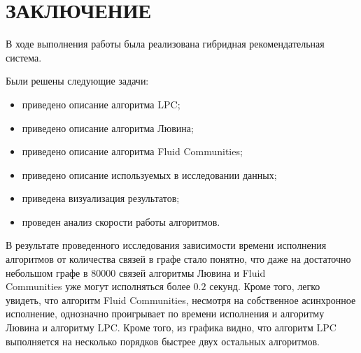 \section*{ЗАКЛЮЧЕНИЕ}
В ходе выполнения работы была реализована гибридная рекомендательная система.

Были решены следующие задачи:
\begin{itemize}
	\item приведено описание алгоритма LPC;
	\item приведено описание алгоритма Лювина;
	\item приведено описание алгоритма Fluid Communities;
	\item приведено описание используемых в исследовании данных;
	\item приведена визуализация результатов;
	\item проведен анализ скорости работы алгоритмов.
\end{itemize}

В результате проведенного исследования зависимости времени исполнения алгоритмов от количества связей в графе стало понятно, что даже на достаточно небольшом графе в 80000 связей алгоритмы Лювина и Fluid\\
Communities уже могут исполняться более $0.2$ секунд. Кроме того, легко увидеть, что алгоритм Fluid Communities, несмотря на собственное асинхронное исполнение, однозначно проигрывает по времени исполнения и алгоритму Лювина и алгоритму LPC. Кроме того, из графика видно, что алгоритм LPC выполняется на несколько порядков быстрее двух остальных алгоритмов.

\pagebreak